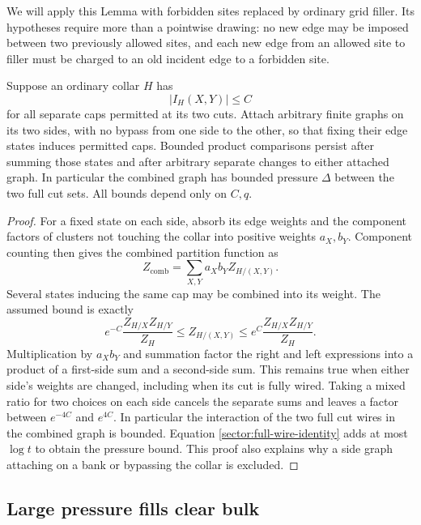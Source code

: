 We will apply this Lemma with forbidden sites replaced by ordinary
grid filler.  Its hypotheses require more than a pointwise drawing:
no new edge may be imposed between two previously allowed sites, and
each new edge from an allowed site to filler must be charged to an
old incident edge to a forbidden site.

\begin{lemma}
\label{sector:attached-sides}
Suppose an ordinary collar $H$ has
\[
 |I_H(X,Y)|\le C
\]
for all separate caps permitted at its two cuts.  Attach arbitrary
finite graphs on its two sides, with no bypass from one side to the
other, so that fixing their edge states induces permitted caps.
Bounded product comparisons persist after summing those states and
after arbitrary separate changes to either attached graph.  In
particular the combined graph has bounded pressure $\Delta$ between
the two full cut sets.  All bounds depend only on $C,q$.
\end{lemma}

\begin{proof}
For a fixed state on each side, absorb its edge weights and the
component factors of clusters not touching the collar into positive
weights $a_X,b_Y$.  Component counting then gives the combined
partition function as
\[
 Z_{\mathrm{comb}}=\sum_{X,Y}a_Xb_YZ_{H/(X,Y)}.
\]
Several states inducing the same cap may be combined into its weight.
The assumed bound is exactly
\[
 e^{-C}\frac{Z_{H/X}Z_{H/Y}}{Z_H}
 \le Z_{H/(X,Y)}
 \le e^C\frac{Z_{H/X}Z_{H/Y}}{Z_H}.
\]
Multiplication by $a_Xb_Y$ and summation factor the right and left
expressions into a product of a first-side sum and a second-side sum.
This remains true when either side's weights are changed, including
when its cut is fully wired.  Taking a mixed ratio for two choices on
each side cancels the separate sums and leaves a factor between
$e^{-4C}$ and $e^{4C}$.  In particular the interaction of the two full
cut wires in the combined graph is bounded.  Equation
\eqref{sector:full-wire-identity} adds at most $\log t$ to obtain
the pressure bound.  This proof also explains why a side graph
attaching on a bank or bypassing the collar is excluded.
\end{proof}

\subsection{Large pressure fills clear bulk}
\label{sector:dense-mass-subsection}

